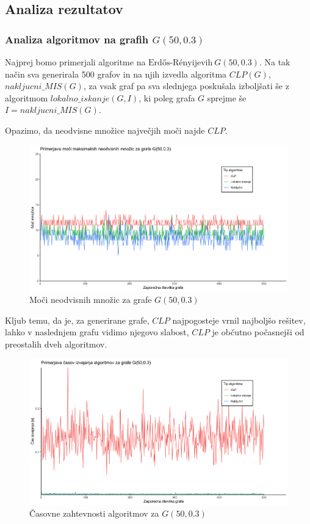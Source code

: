 \documentclass[a4paper, 12pt]{article}
\begin{document}
\newpage

\subsection{Analiza rezultatov}

\subsubsection{Analiza algoritmov na grafih $G(50, 0.3)$}

Najprej bomo primerjali algoritme na $\text{Erdős-Rényijevih}\ G(50, 0.3)$. Na tak način sva generirala 500 grafov in na njih izvedla algoritma $CLP(G)$, $nakljucni\_MIS(G)$, za vsak graf pa sva slednjega poskušala izboljšati
še z algoritmom $lokalno\_iskanje(G, I)$, ki poleg grafa $G$ sprejme še $I = nakljucni\_MIS(G)$.

Opazimo, da neodvisne množice največjih moči najde $CLP$.

\begin{figure}[h!]
	\begin{center}
		\includegraphics[scale=0.10]{R_koda/pon-moc.png}
		\caption{Moči neodvisnih množic za grafe $G(50,0.3)$}
	\end{center}
\end{figure}

Kljub temu, da je, za generirane grafe, $CLP$ najpogosteje vrnil najboljšo rešitev, lahko v naslednjem grafu vidimo njegovo slabost, $CLP$ je občutno počasnejši od preostalih dveh algoritmov. 
\begin{figure}[h!]
	\begin{center}
		\includegraphics[scale=0.10]{R_koda/pon-casi.png}
		\caption{Časovne zahtevnosti algoritmov za $G(50, 0.3)$}
	\end{center}
\end{figure}
\end{document}
